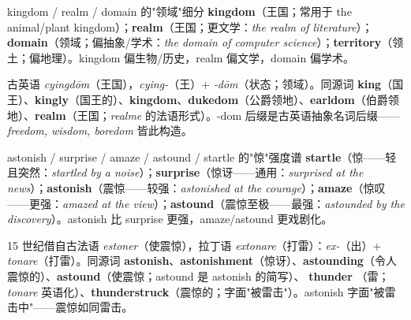 \documentclass[../main.tex]{subfiles}
\begin{document}

\begin{gram}{kingdom / realm / domain 的"领域"细分}
\textbf{kingdom}（王国；常用于 the animal/plant kingdom）；\textbf{realm}（王国；更文学：\textit{the realm of literature}）；\textbf{domain}（领域；偏抽象/学术：\textit{the domain of computer science}）；\textbf{territory}（领土；偏地理）。kingdom 偏生物/历史，realm 偏文学，domain 偏学术。
\end{gram}

\begin{origin}
古英语 \textit{cyingdōm}（王国），\textit{cying-}（王）+ \textit{-dōm}（状态；领域）。同源词 \textbf{king}（国王）、\textbf{kingly}（国王的）、\textbf{kingdom}、\textbf{dukedom}（公爵领地）、\textbf{earldom}（伯爵领地）、\textbf{realm}（王国；\textit{realme} 的法语形式）。-dom 后缀是古英语抽象名词后缀——\textit{freedom, wisdom, boredom} 皆此构造。
\end{origin}



\begin{lex}{astonish / surprise / amaze / astound / startle 的"惊"强度谱}
\textbf{startle}（惊——轻且突然：\textit{startled by a noise}）；\textbf{surprise}（惊讶——通用：\textit{surprised at the news}）；\textbf{astonish}（震惊——较强：\textit{astonished at the courage}）；\textbf{amaze}（惊叹——更强：\textit{amazed at the view}）；\textbf{astound}（震惊至极——最强：\textit{astounded by the discovery}）。astonish 比 surprise 更强，amaze/astound 更戏剧化。
\end{lex}

\begin{origin}
15 世纪借自古法语 \textit{estoner}（使震惊），拉丁语 \textit{extonare}（打雷）：\textit{ex-}（出）+ \textit{tonare}（打雷）。同源词 \textbf{astonish}、\textbf{astonishment}（惊讶）、\textbf{astounding}（令人震惊的）、\textbf{astound}（使震惊；astound 是 astonish 的简写）、\textbf{ thunder }（雷；\textit{tonare} 英语化）、\textbf{thunderstruck}（震惊的；字面"被雷击"）。astonish 字面"被雷击中"——震惊如同雷击。
\end{origin}

\end{document}
